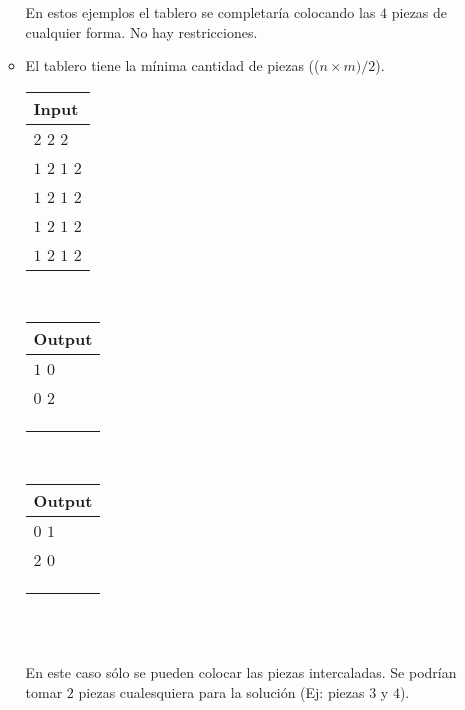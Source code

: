 \documentclass[11pt, a4paper, twoside]{article}
\begin{document}
\begin{itemize}
\begin{itemize}
			En estos ejemplos el tablero se completaría colocando las $4$ piezas de cualquier forma. No hay restricciones. \\

		\item El tablero tiene la mínima cantidad de piezas (($n \times m)/2$).\\
		
		    \begin{minipage}{0.2\textwidth}
				\begin{tabular}{l}
					Input  \\
					\hline
					$2$ $2$ $2$       \\
					$1$ $2$ $1$ $2$ \\
					$1$ $2$ $1$ $2$ \\
					$1$ $2$ $1$ $2$ \\
					$1$ $2$ $1$ $2$ \\
				\end{tabular} \\  
			\end{minipage}
			\begin{minipage}{0.2\textwidth}	
				\begin{tabular}{l}
					Output  \\
					\hline
					$1$ $0$ \\
					$0$ $2$ \\
					\\
					\\
					\\
				\end{tabular} \\
			\end{minipage} 
			\begin{minipage}{0.2\textwidth}	
				\begin{tabular}{l}
					Output  \\
					\hline
					$0$ $1$ \\
					$2$ $0$ \\
					\\
					\\
					\\
				\end{tabular} \\
			\end{minipage} \\
			
			En este caso sólo se pueden colocar las piezas intercaladas. Se podrían tomar $2$ piezas cualesquiera para la solución (Ej: piezas $3$ y $4$). \\
			

\end{itemize}
\end{itemize}
\end{document}
